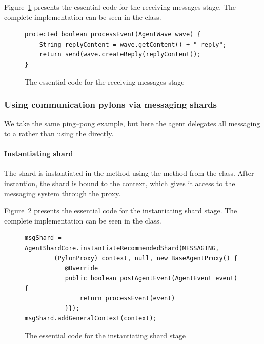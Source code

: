 \documentclass{article}
\begin{document}
Figure~\ref{fig:func:processEvent:code} presents the essential code for the receiving messages stage. The complete implementation can be seen in the  class.

\begin{figure}[ht]\centering
\begin{lstlisting}
protected boolean processEvent(AgentWave wave) {
    String replyContent = wave.getContent() + " reply";
    return send(wave.createReply(replyContent));
}
\end{lstlisting}
\caption{The essential code for the receiving messages stage}\label{fig:func:processEvent:code}
\end{figure}


\subsubsection{Using communication pylons via messaging shards}\label{sec:using-pylons-via-shards}

We take the same ping–pong example, but here the agent delegates all messaging to a  rather than using the  directly.


\paragraph{Instantiating shard} 

The shard is instantiated in the  method using the  method from the  class. After instantion, the shard is bound to the context, which gives it access to the messaging system through the proxy.

Figure~\ref{fig:func:registerAgentPingPong:code} presents the essential code for the instantiating shard stage. The complete implementation can be seen in the  class.

\begin{figure}[ht]\centering
\begin{lstlisting}
msgShard = AgentShardCore.instantiateRecommendedShard(MESSAGING,
		(PylonProxy) context, null, new BaseAgentProxy() {
		   @Override
		   public boolean postAgentEvent(AgentEvent event) {
			   return processEvent(event)
		   }});
msgShard.addGeneralContext(context);
\end{lstlisting}
\caption{The essential code for the instantiating shard stage}\label{fig:func:registerAgentPingPong:code}
\end{figure}
\end{document}
